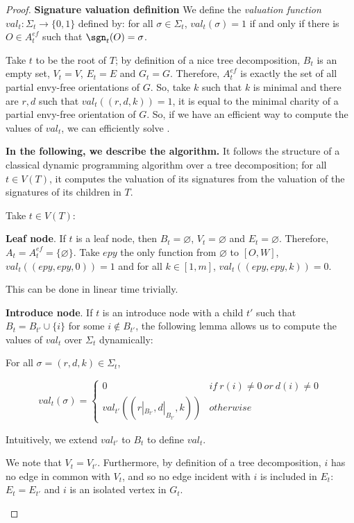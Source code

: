 \documentclass[11pt,letterpaper]{article}
\begin{document}
\begin{proof}
    \textbf{Signature valuation definition} We define the \emph{valuation function} $val_t \colon \Sigma_t \to \{0,1\}$ defined by: for all $\sigma\in \Sigma_t$, $val_t(\sigma)=1$ if and only if there is $O\in A_t^{ef}$ such that $\sgn_t(O)=\sigma$.
    \medskip

    Take $t$ to be the root of $T$; by definition of a nice tree decomposition, $B_t$ is an empty set, $V_t=V$, $E_t=E$ and $G_t=G$. Therefore, $A_t^{ef}$ is exactly the set of all partial envy-free orientations of $G$. So, take $k$ such that $k$ is minimal and there are $r,d$ such that $val_t((r,d,k))=1$, it is equal to the minimal charity of a partial envy-free orientation of $G$. So, if we have an efficient way to compute the values of $val_t$, we can efficiently solve \EFmc.


    \textbf{In the following, we describe the algorithm.} It follows the structure of a classical dynamic programming algorithm over a tree decomposition; for all $t\in V(T)$, it computes the valuation of its signatures from the valuation of the signatures of its children in $T$.

    Take $t\in V(T)$:

    \textbf{Leaf node}. If $t$ is a leaf node, then $B_t=\varnothing$, $V_t=\varnothing$ and $E_t=\varnothing$. Therefore, $A_t=A_t^{ef}=\{\varnothing\}$. Take $epy$ the only function from $\varnothing$ to $[O,W]$, $val_t((epy,epy,0))=1$ and for all $k\in [1,m]$, $val_t((epy,epy,k))=0$.

    This can be done in linear time trivially.
    \medskip

    \textbf{Introduce node}. If $t$ is an introduce node with a child $t'$ such that $B_t=B_{t'}\cup \{i\}$ for some $i\notin B_{t'}$, the following lemma allows us to compute the values of $val_t$ over $\Sigma_t$ dynamically:
    \begin{lemma}
    For all $\sigma=(r,d,k)\in \Sigma_t$,

    \[val_t(\sigma)=
    \begin{cases}
        0 & if\ r(i)\neq 0\ or\ d(i)\neq 0 \\
        val_{t'}((r|_{B_{t'}},d|_{B_{t'}},k)) & otherwise
    \end{cases}\]

    \end{lemma}

    Intuitively, we extend $val_{t'}$ to $B_t$ to define $val_t$.

    \begin{nestedproof}
    We note that $V_t=V_{t'}$. Furthermore, by definition of a tree decomposition, $i$ has no edge in common with $V_t$, and so no edge incident with $i$ is included in $E_t$: $E_t=E_{t'}$ and $i$ is an isolated vertex in $G_t$.


\end{nestedproof}
\end{proof}
\end{document}
